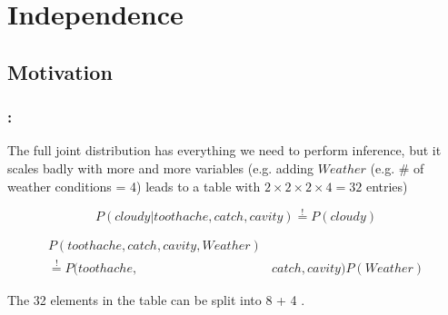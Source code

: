 \section{Independence}



\subsection{Motivation}

\begin{frame}\frametitle{\secname:~\subsecname}

The full joint distribution has everything we need to perform inference,
but it scales badly with more and more variables (e.g. adding $\mathit{Weather}$ (e.g. \# of weather conditions = 4) leads to a table with $2\times2\times2\times4=32$ entries)

\pause


\pause

\slidesonly{\vspace{-5mm}}

\begin{equation}
P(\mathit{cloudy} | \mathit{toothache}, \mathit{catch}, \mathit{cavity}) \stackrel{!}{=} P(\mathit{cloudy})
\end{equation}

\pause


\pause


\slidesonly{\vspace{-5mm}}

\begin{align}
P(\mathit{toothache}, \mathit{catch}, \mathit{cavity}, \mathit{Weather}) &\\
\stackrel{!}{=} P(\mathit{toothache}, &\mathit{catch}, \mathit{cavity})P(\mathit{Weather})
\end{align}


The 32 elements in the table can be split into  8 + 4 .

\end{frame} 

